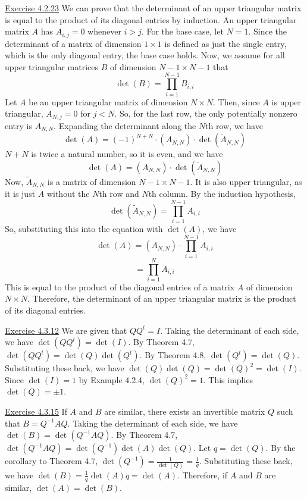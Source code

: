 \documentclass{exam}
\begin{document}
\underline{Exercise 4.2.23}
\newline
\newline
We can prove that the determinant of an upper triangular matrix is equal to the product of its diagonal entries by induction. An upper triangular matrix $A$ has $A_{i,j}=0$ whenever $i>j$. For the base case, let $N=1$. Since the determinant of a matrix of dimension $1\times1$ is defined as just the single entry, which is the only diagonal entry, the base case holds. Now, we assume for all upper triangular matrices $B$ of dimension $N-1\times N-1$ that
\[\det(B)=\prod_{i=1}^{N-1}B_{i,i}\]
Let $A$ be an upper triangular matrix of dimension $N\times N$. Then, since $A$ is upper triangular, $A_{N,j}=0$ for $j<N$. So, for the last row, the only potentially nonzero entry is $A_{N,N}$. Expanding the determinant along the $N$th row, we have
\[\det(A)=(-1)^{N+N}\cdot(A_{N,N})\cdot\det(\tilde{A}_{N,N})\]
$N+N$ is twice a natural number, so it is even, and we have
\[\det(A)=(A_{N,N})\cdot\det(\tilde{A}_{N,N})\]
Now, $\tilde{A}_{N,N}$ is a matrix of dimension $N-1\times N-1$. It is also upper triangular, as it is just $A$ without the $N$th row and $N$th column. By the induction hypothesis, \[\det(\tilde{A}_{N,N})=\prod_{i=1}^{N-1}A_{i,i}\]
So, substituting this into the equation with $\det(A)$, we have
\[\det(A)=(A_{N,N})\cdot\prod_{i=1}^{N-1}A_{i,i}\]
\[=\prod_{i=1}^{N}A_{i,i}\]
This is equal to the product of the diagonal entries of a matrix $A$ of dimension $N\times N$. Therefore, the determinant of an upper triangular matrix is the product of its diagonal entries.
\newline

\underline{Exercise 4.3.12}
\newline
\newline
We are given that $QQ^t=I$. Taking the determinant of each side, we have $\det(QQ^t)=\det(I)$. By Theorem 4.7, $\det(QQ^t)=\det(Q)\det(Q^t)$. By Theorem 4.8, $\det(Q^t)=\det(Q)$. Substituting these back, we have $\det(Q)\det(Q)=\det(Q)^2=\det(I)$. Since $\det(I)=1$ by Example 4.2.4, $\det(Q)^2=1$. This implies $\det(Q)=\pm1$.
\newline

\underline{Exercise 4.3.15}
\newline
\newline
If $A$ and $B$ are similar, there exists an invertible matrix $Q$ such that $B=Q^{-1}AQ$. Taking the determinant of each side, we have $\det(B)=\det(Q^{-1}AQ)$. By Theorem 4.7, $\det(Q^{-1}AQ)=\det(Q^{-1})\det(A)\det(Q)$. Let $q=\det(Q)$. By the corollary to Theorem 4.7, $\det(Q^{-1})=\frac{1}{\det(Q)}=\frac{1}{q}$. Substituting these back, we have $\det(B)=\frac{1}{q}\det(A)q=\det(A)$. Therefore, if $A$ and $B$ are similar, $\det(A)=\det(B)$.
\newline
\end{document}

